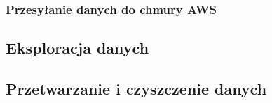 \documentclass[12pt, a4paper]{article}
\begin{document}
\subsubsection{Przesyłanie danych do chmury AWS}









\subsection{Eksploracja danych}


\subsection{Przetwarzanie i czyszczenie danych}
\end{document}

